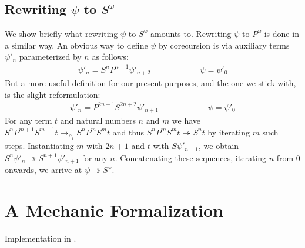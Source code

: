 \subsection{\texorpdfstring{Rewriting $\psi$ to $S^\omega$}{Rewriting
    PSSPPP... to SSS...}}

We show briefly what rewriting $\psi$ to $S^\omega$ amounts
to. Rewriting $\psi$ to $P^\omega$ is done in a similar way.
An obvious way to define $\psi$ by corecursion is via auxiliary terms
$\psi'_n$ parameterized by $n$ as follows:
\begin{align*}
  \psi'_n = S^n P^{n + 1} \psi'_{n + 2} \qquad \qquad \qquad
  \psi = \psi'_0
\end{align*}
But a more useful definition for our present purposes, and the one we
stick with, is the slight reformulation:
\begin{align*}
  \psi'_n = P^{2 n + 1} S^{2 n + 2} \psi'_{n + 1} \qquad
  \qquad \qquad
  \psi = \psi'_0
\end{align*}
For any term $t$ and natural numbers $n$ and $m$ we have $S^n P^{m+1}
S^{m+1} t \rightarrow_{\rho_1} S^n P^m S^m t$ and thus $S^n P^m S^m t
\twoheadrightarrow S^n t$ by iterating $m$ such steps. Instantiating
$m$ with $2 n + 1$ and $t$ with $S \psi'_{n + 1}$, we obtain
$S^n \psi'_n \twoheadrightarrow S^{n+1} \psi'_{n + 1}$ for any $n$.
Concatenating these sequences, iterating $n$ from $0$ onwards, we
arrive at $\psi \twoheadrightarrow S^\omega$.


\section{A Mechanic Formalization}

Implementation in \Coq.
